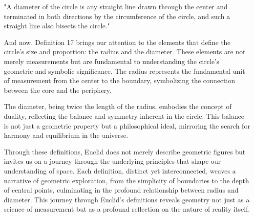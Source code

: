 
\begin{defin}
"A diameter of the circle is any straight line drawn through the center and terminated in both directions by the circumference of the circle, and such a straight line also bisects the circle."
\end{defin}

And now, Definition 17 brings our attention to the elements that define the circle's size and proportion: the radius and the diameter. These elements are not merely measurements but are fundamental to understanding the circle's geometric and symbolic significance. The radius represents the fundamental unit of measurement from the center to the boundary, symbolizing the connection between the core and the periphery.

The diameter, being twice the length of the radius, embodies the concept of duality, reflecting the balance and symmetry inherent in the circle. This balance is not just a geometric property but a philosophical ideal, mirroring the search for harmony and equilibrium in the universe.

Through these definitions, Euclid does not merely describe geometric figures but invites us on a journey through the underlying principles that shape our understanding of space. Each definition, distinct yet interconnected, weaves a narrative of geometric exploration, from the simplicity of boundaries to the depth of central points, culminating in the profound relationship between radius and diameter. This journey through Euclid's definitions reveals geometry not just as a science of measurement but as a profound reflection on the nature of reality itself.

\clearpage
